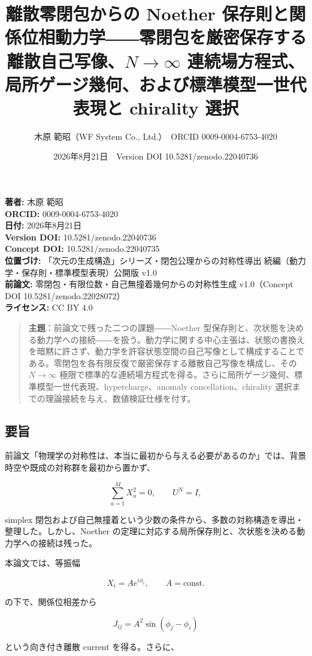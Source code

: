\documentclass[
  a4paper,
]{ltjsarticle}
\title{離散零閉包からの Noether
保存則と関係位相動力学――零閉包を厳密保存する離散自己写像、\(N\to\infty\)
連続場方程式、局所ゲージ幾何、および標準模型一世代表現と chirality 選択}
\author{木原 範昭（WF System Co., Ltd.）　ORCID 0009-0004-6753-4020}
\date{2026年8月21日　Version DOI 10.5281/zenodo.22040736}
\begin{document}
\maketitle

\textbf{著者:} 木原 範昭\\
\textbf{ORCID:} 0009-0004-6753-4020\\
\textbf{日付:} 2026年8月21日\\
\textbf{Version DOI:} 10.5281/zenodo.22040736\\
\textbf{Concept DOI:} 10.5281/zenodo.22040735\\
\textbf{位置づけ:} 「次元の生成構造」シリーズ・閉包公理からの対称性導出
続編（動力学・保存則・標準模型表現）公開版 v1.0\\
\textbf{前論文:} 零閉包・有限位数・自己無撞着幾何からの対称性生成
v1.0（Concept DOI 10.5281/zenodo.22028072）\\
\textbf{ライセンス:} CC BY 4.0

\begin{quote}
\textbf{主題}：前論文で残った二つの課題――Noether
型保存則と、次状態を決める動力学への接続――を扱う。動力学に関する中心主張は、状態の書換えを暗黙に許さず、動力学を許容状態空間の自己写像として構成することである。零閉包を各有限反復で厳密保存する離散自己写像を構成し、その
\(N\to\infty\)
極限で標準的な連続場方程式を得る。さらに局所ゲージ幾何、標準模型一世代表現、hypercharge、anomaly
cancellation、chirality 選択までの理論接続を与え、数値検証仕様を付す。
\end{quote}

\subsection{要旨}\label{ux8981ux65e8}

前論文「物理学の対称性は、本当に最初から与える必要があるのか」では、背景時空や既成の対称群を最初から置かず、

\[
\sum_{a=1}^{M}X_a^2=0,
\qquad
U^N=I,
\]

simplex
閉包および自己無撞着という少数の条件から、多数の対称構造を導出・整理した。しかし、Noether
の定理に対応する局所保存則と、次状態を決める動力学への接続は残った。

本論文では、等振幅

\[
X_i=Ae^{i\phi_i},
\qquad
A=\mathrm{const.}
\]

の下で、関係位相差から

\[
J_{ij}
=
A^2\sin(\phi_j-\phi_i)
\]

という向き付き離散 current を得る。さらに、
\end{document}
